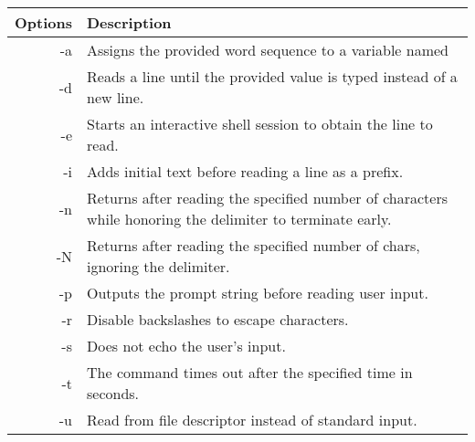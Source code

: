 \documentclass{article}
\begin{document}
\begin{itemize}
\begin{paracol}{2}
		      \footnotesize{\begin{tabularx}{\linewidth}{| r | >{\raggedright\arraybackslash}X|}\hline
				      \textbf{Options} & \textbf{Description}                                                                                      \\\hline
				      -a               & Assigns the provided word sequence to a variable named                                                    \\\hline
				      -d               & Reads a line until the provided value is typed instead of a new line.                                     \\\hline
				      -e               & Starts an interactive shell session to obtain the line to read.                                           \\\hline
				      -i               & Adds initial text before reading a line as a prefix.                                                      \\\hline
				      -n               & Returns after reading the specified number of characters while honoring the delimiter to terminate early. \\\hline
				      -N               & Returns after reading the specified number of chars, ignoring the delimiter.                              \\\hline
				      -p               & Outputs the prompt string before reading user input.                                                      \\\hline
				      -r               & Disable backslashes to escape characters.                                                                 \\\hline
				      -s               & Does not echo the user's input.                                                                           \\\hline
				      -t               & The command times out after the specified time in seconds.                                                \\\hline
				      -u               & Read from file descriptor instead of standard input.                                                      \\\hline
			      \end{tabularx}}
	      \end{paracol}

\end{itemize}
\end{document}
